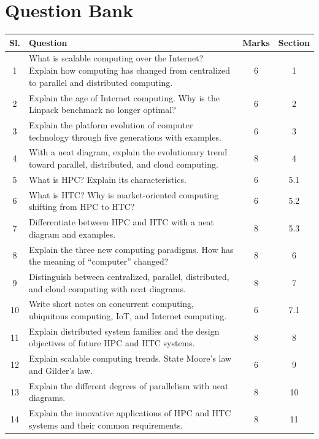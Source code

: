\documentclass[11pt,a4paper]{article}
\begin{document}
\section{Question Bank}
\label{sec:qbank}

\begin{center}
\renewcommand{\arraystretch}{1.3}
\small
\begin{tabularx}{\linewidth}{|c|X|c|c|}
\hline
\textbf{Sl.} & \textbf{Question} & \textbf{Marks} & \textbf{Section} \\ \hline
1 & What is scalable computing over the Internet? Explain how computing has changed from centralized to parallel and distributed computing. & 6 & 1 \\ \hline
2 & Explain the age of Internet computing. Why is the Linpack benchmark no longer optimal? & 6 & 2 \\ \hline
3 & Explain the platform evolution of computer technology through five generations with examples. & 6 & 3 \\ \hline
4 & With a neat diagram, explain the evolutionary trend toward parallel, distributed, and cloud computing. & 8 & 4 \\ \hline
5 & What is HPC? Explain its characteristics. & 6 & 5.1 \\ \hline
6 & What is HTC? Why is market-oriented computing shifting from HPC to HTC? & 6 & 5.2 \\ \hline
7 & Differentiate between HPC and HTC with a neat diagram and examples. & 8 & 5.3 \\ \hline
8 & Explain the three new computing paradigms. How has the meaning of ``computer'' changed? & 8 & 6 \\ \hline
9 & Distinguish between centralized, parallel, distributed, and cloud computing with neat diagrams. & 8 & 7 \\ \hline
10 & Write short notes on concurrent computing, ubiquitous computing, IoT, and Internet computing. & 6 & 7.1 \\ \hline
11 & Explain distributed system families and the design objectives of future HPC and HTC systems. & 8 & 8 \\ \hline
12 & Explain scalable computing trends. State Moore's law and Gilder's law. & 6 & 9 \\ \hline
13 & Explain the different degrees of parallelism with neat diagrams. & 8 & 10 \\ \hline
14 & Explain the innovative applications of HPC and HTC systems and their common requirements. & 8 & 11 \\ \hline

\end{tabularx}
\end{center}
\end{document}
